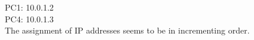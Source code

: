 PC1: 10.0.1.2 \\
PC4: 10.0.1.3 \\

The assignment of IP addresses seems to be in incrementing order.
